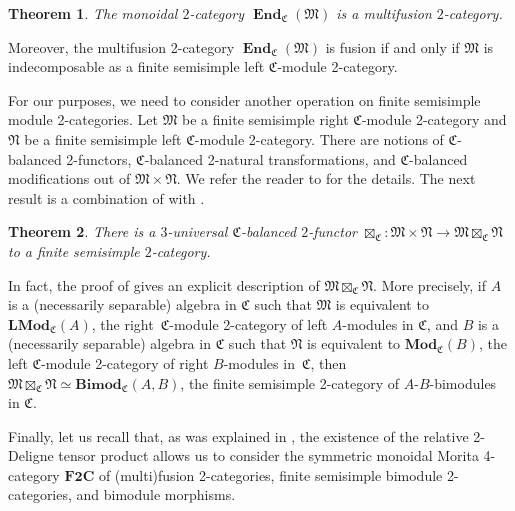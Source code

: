 \documentclass[10pt,a4paper]{amsart}
\newtheorem{Theorem}{Theorem}[section]
\numberwithin{equation}{section}
\begin{document}
\begin{Theorem}\label{thm:Moritadual}
The monoidal $2$-category $\mathbf{\operatorname{End}}_{\mathfrak{C}}(\mathfrak{M})$ is a multifusion $2$-category.
\end{Theorem}

Moreover, the multifusion 2-category $\mathbf{\operatorname{End}}_{\mathfrak{C}}(\mathfrak{M})$ is fusion if and only if $\mathfrak{M}$ is indecomposable as a finite semisimple left $\mathfrak{C}$-module 2-category.

For our purposes, we need to consider another operation on finite semisimple module 2-categories. Let $\mathfrak{M}$ be a finite semisimple right $\mathfrak{C}$-module 2-category and $\mathfrak{N}$ be a finite semisimple left $\mathfrak{C}$-module 2-category. There are notions of $\mathfrak{C}$-balanced 2-functors, $\mathfrak{C}$-balanced 2-natural transformations, and $\mathfrak{C}$-balanced modifications out of $\mathfrak{M}\times\mathfrak{N}$. We refer the reader to \cite[Section~2.2]{D10} for the details. The next result is a combination of \cite[Theorem~2.2.4]{D10} with \cite[Corollary~5.1.3]{D9}.

\begin{Theorem}
There is a $3$-universal $\mathfrak{C}$-balanced $2$-functor $\boxtimes_{\mathfrak{C}}\colon \mathfrak{M}\times\mathfrak{N}\rightarrow \mathfrak{M}\boxtimes_{\mathfrak{C}}\mathfrak{N}$ to a finite semisimple $2$-category.
\end{Theorem}

In fact, the proof of \cite[Theorem~2.2.4]{D10} gives an explicit description of $\mathfrak{M}\boxtimes_{\mathfrak{C}}\mathfrak{N}$. More precisely, if $A$ is a (necessarily separable) algebra in $\mathfrak{C}$ such that $\mathfrak{M}$ is equivalent to $\mathbf{LMod}_{\mathfrak{C}}(A)$, the right~$\mathfrak{C}$-module 2-category of left $A$-modules in $\mathfrak{C}$, and $B$ is a (necessarily separable) algebra in $\mathfrak{C}$ such that $\mathfrak{N}$ is equivalent to $\mathbf{Mod}_{\mathfrak{C}}(B)$, the left $\mathfrak{C}$-module 2-category of right $B$-modules in~$\mathfrak{C}$, then~$\mathfrak{M}\boxtimes_{\mathfrak{C}}\mathfrak{N}\simeq \mathbf{Bimod}_{\mathfrak{C}}(A,B)$, the finite semisimple 2-category of $A$-$B$-bimodules in $\mathfrak{C}$.

Finally, let us recall that, as was explained in \cite[Section~3.2]{D10}, the existence of the relative 2-Deligne tensor product allows us to consider the symmetric monoidal Morita 4-category $\mathbf{F2C}$ of (multi)fusion 2-categories, finite semisimple bimodule 2-categories, and bimodule morphisms.
\end{document}

